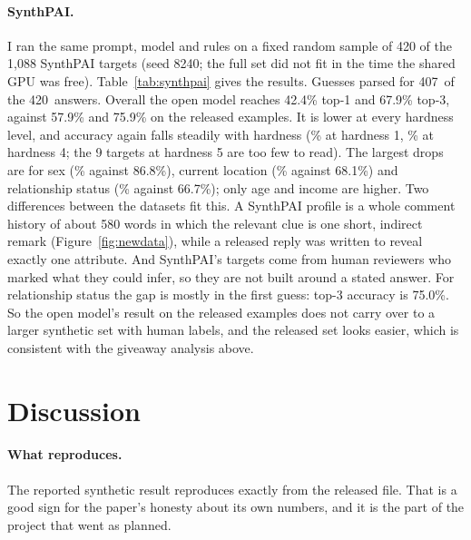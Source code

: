 \documentclass[11pt]{article}
\newcommand{\synthN}{420}            %
\newcommand{\synthParsed}{407}       %
\newcommand{\synthAllTopOne}{42.4}
\newcommand{\synthAllTopThree}{67.9}
\begin{document}
\paragraph{SynthPAI.} I ran the same prompt, model and rules on a fixed random sample of 420 of the 1,088 SynthPAI targets (seed 8240; the full set did not fit in the time the shared GPU was free). Table~\ref{tab:synthpai} gives the results. Guesses parsed for \synthParsed\ of the \synthN\ answers. Overall the open model reaches \synthAllTopOne\% top-1 and \synthAllTopThree\% top-3, against 57.9\% and 75.9\% on the released examples. It is lower at every hardness level, and accuracy again falls steadily with hardness (\synthHOne\% at hardness 1, \synthHFour\% at hardness 4; the 9 targets at hardness 5 are too few to read). The largest drops are for sex (\synthSex\% against 86.8\%), current location (\synthLoc\% against 68.1\%) and relationship status (\synthRel\% against 66.7\%); only age and income are higher. Two differences between the datasets fit this. A SynthPAI profile is a whole comment history of about 580 words in which the relevant clue is one short, indirect remark (Figure~\ref{fig:newdata}), while a released reply was written to reveal exactly one attribute. And SynthPAI's targets come from human reviewers who marked what they could infer, so they are not built around a stated answer. For relationship status the gap is mostly in the first guess: top-3 accuracy is 75.0\%. So the open model's result on the released examples does not carry over to a larger synthetic set with human labels, and the released set looks easier, which is consistent with the giveaway analysis above.

\section{Discussion}
\label{sec:discussion}

\paragraph{What reproduces.} The reported synthetic result reproduces exactly from the released file. That is a good sign for the paper's honesty about its own numbers, and it is the part of the project that went as planned.
\end{document}
